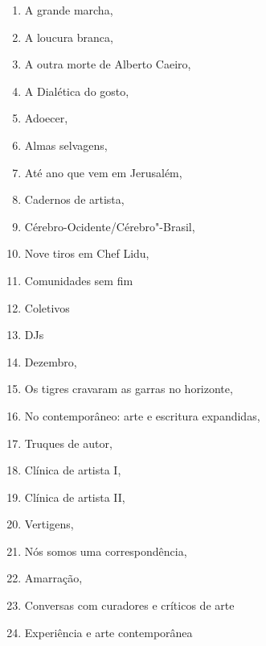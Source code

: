 \begin{multicols}{2}
\begin{enumerate}
\item A grande marcha, {}
\item A loucura branca, {}
\item A outra morte de Alberto Caeiro, {}
\item A Dialética do gosto, {}
\item Adoecer, {}
\item Almas selvagens, {}
\item Até ano que vem em Jerusalém, {}
\item Cadernos de artista, {}
\item Cérebro-Ocidente/Cérebro"-Brasil, {}
\item Nove tiros em Chef Lidu, {}
\item Comunidades sem fim
\item Coletivos
\item DJs
\item Dezembro, {}
\item Os tigres cravaram as garras no horizonte, {}
\item No contemporâneo: arte e escritura expandidas, {}
\item Truques de autor, {}
\item Clínica de artista I, {}
\item Clínica de artista II, {}
\item Vertigens, {}
\item Nós somos uma correspondência, {}
\item Amarração, {}
\item Conversas com curadores e críticos de arte
\item Experiência e arte contemporânea

\end{enumerate}
\end{multicols}
